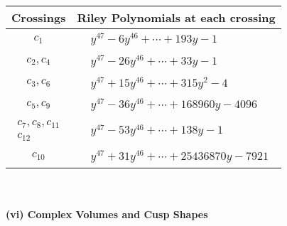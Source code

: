 \documentclass[1p]{elsarticle_modified}
\theoremstyle{definition}
\begin{document}
\begin{tabular}{m{50pt}|m{274pt}}
Crossings & \hspace{64pt}Riley Polynomials at each crossing \\
\hline $$\begin{aligned}c_{1}\end{aligned}$$&$\begin{aligned}
&y^{47}-6 y^{46}+\cdots+193 y-1
\end{aligned}$\\
\hline $$\begin{aligned}c_{2},c_{4}\end{aligned}$$&$\begin{aligned}
&y^{47}-26 y^{46}+\cdots+33 y-1
\end{aligned}$\\
\hline $$\begin{aligned}c_{3},c_{6}\end{aligned}$$&$\begin{aligned}
&y^{47}+15 y^{46}+\cdots+315 y^2-4
\end{aligned}$\\
\hline $$\begin{aligned}c_{5},c_{9}\end{aligned}$$&$\begin{aligned}
&y^{47}-36 y^{46}+\cdots+168960 y-4096
\end{aligned}$\\
\hline $$\begin{aligned}c_{7},c_{8},c_{11}\\c_{12}\end{aligned}$$&$\begin{aligned}
&y^{47}-53 y^{46}+\cdots+138 y-1
\end{aligned}$\\
\hline $$\begin{aligned}c_{10}\end{aligned}$$&$\begin{aligned}
&y^{47}+31 y^{46}+\cdots+25436870 y-7921
\end{aligned}$\\
\hline
\end{tabular}\\~\\
\newpage\flushleft \textbf{(vi) Complex Volumes and Cusp Shapes}
\end{document}
